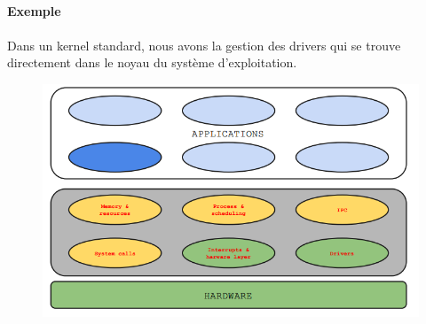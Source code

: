 \paragraph{}
\textbf{Exemple}
\paragraph{}
Dans un kernel standard, nous avons la gestion des drivers qui se trouve directement dans le noyau du système d'exploitation.
\begin{figure}[H]
\includegraphics[scale=0.7]{img_7_4__0}
\end{figure}
